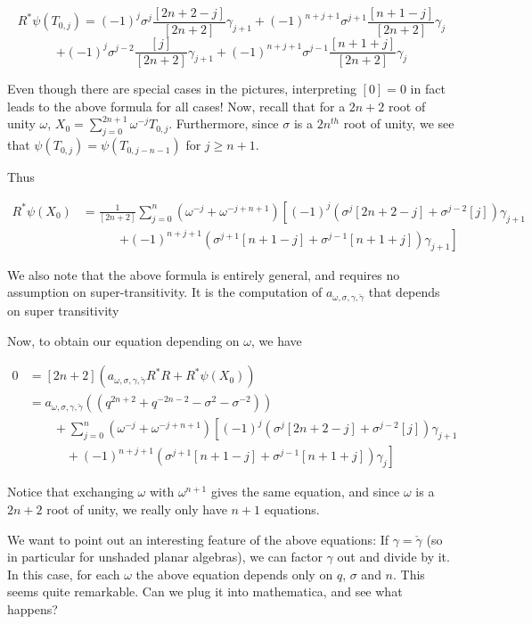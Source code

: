 \documentclass[12pt]{article}
\begin{document}
$$R^{*}\psi(T_{0,j})=(-1)^{j}\sigma^{j}\frac{[2n+2-j]}{[2n+2]} \gamma_{j+1}+(-1)^{n+j+1}\sigma^{j+1}\frac{[n+1-j]}{[2n+2]} \gamma_{j}$$
$$+(-1)^{j}\sigma^{j-2}\frac{[j]}{[2n+2]} \gamma_{j+1}+(-1)^{n+j+1}\sigma^{j-1}\frac{[n+1+j]}{[2n+2]} \gamma_{j}$$

Even though there are special cases in the pictures, interpreting $[0]=0$ in fact leads to the above formula for all cases!  Now, recall that for a $2n+2$ root of unity $\omega$, $X_{0}=\sum^{2n+1}_{j=0} \omega^{-j}T_{0,j}$.  Furthermore, since $\sigma$ is a $2n^{th}$ root of unity, we see that $\psi(T_{0,j})=\psi(T_{0,j-n-1})$ for $j\ge n+1$.

Thus 

\begin{align*}
R^{*}\psi(X_0) & = \frac{1}{[2n+2]} \sum^{n}_{j=0}(\omega^{-j}+\omega^{-j+n+1})\left[ (-1)^{j} \left(\sigma^{j}[2n+2-j]
+\sigma^{j-2}[j]\right) \gamma_{j+1}
\right. \\
& \qquad \quad
\left.+(-1)^{n+j+1} \left( \sigma^{j+1}[n+1-j]+\sigma^{j-1}[n+1+j] \right)\gamma_{j+1}\right]
\end{align*}


We also note that the above formula is entirely general, and requires no assumption on super-transitivity.  It is the computation of $a_{\omega, \sigma, \gamma, \check{\gamma}}$ that depends on super transitivity

Now, to obtain our equation depending on $\omega$, we have

\begin{align*}
0 & = [2n+2]\left( a_{\omega, \sigma, \gamma, \check{\gamma}} R^{*}R+R^{*}\psi(X_0) \right) \\
  & = a_{\omega, \sigma, \gamma, \check{\gamma}}((q^{2n+2}+q^{-2n-2}-\sigma^{2}-\sigma^{-2})) \\
  & \qquad + \sum^{n}_{j=0}(\omega^{-j}+\omega^{-j+n+1})\left[ (-1)^{j} \left(\sigma^{j}[2n+2-j] +\sigma^{j-2}[j]\right) \gamma_{j+1}
\right. \\
 &  \qquad \quad + \left. (-1)^{n+j+1}\left( \sigma^{j+1}[n+1-j]+\sigma^{j-1}[n+1+j] \right)\gamma_{j}\right]
\end{align*}


Notice that exchanging $\omega$ with $\omega^{n+1}$ gives the same equation, and since $\omega$ is a $2n+2$ root of unity, we really only have $n+1$ equations.

 We want to point out an interesting feature of the above equations:  If $\gamma=\check{\gamma}$ (so in particular for unshaded planar algebras), we can factor $\gamma$ out and divide by it.  In this case, for each $\omega$ the above equation depends only on $q$, $\sigma$ and $n$.  This seems quite remarkable.  Can we plug it into mathematica, and see what happens?
\end{document}
